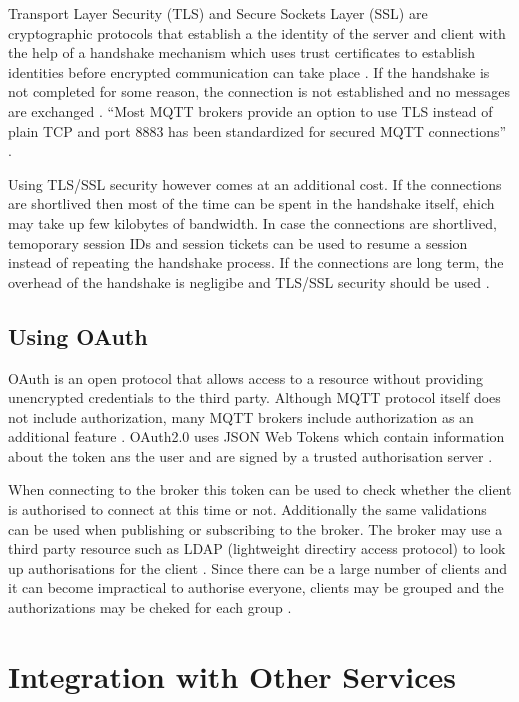 \documentclass[sigconf]{acmart}
\begin{document}
Transport Layer Security (TLS) and Secure Sockets Layer (SSL) are
cryptographic protocols that establish a the identity of the server
and client with the help of a handshake mechanism which uses trust
certificates to establish identities before encrypted communication
can take place \cite{ibm-mqtt-security}. If the handshake is not
completed for some reason, the connection is not established and no
messages are exchanged \cite{mqtt-sec-ssl}. ``Most MQTT brokers
provide an option to use TLS instead of plain TCP and port 8883 has
been standardized for secured MQTT connections''
\cite{iot-design-mqtt-security}.

Using TLS/SSL security however comes at an additional cost. If the
connections are shortlived then most of the time can be spent in the
handshake itself, ehich may take up few kilobytes of bandwidth. In
case the connections are shortlived, temoporary session IDs and
session tickets can be used to resume a session instead of repeating
the handshake process. If the connections are long term, the overhead
of the handshake is negligibe and TLS/SSL security should be used
\cite{iot-design-mqtt-security}\cite{mqtt-sec-ssl}.

\subsection{Using OAuth}

OAuth is an open protocol that allows access to a resource without
providing unencrypted credentials to the third party. Although MQTT
protocol itself does not include authorization, many MQTT brokers
include authorization as an additional feature
\cite{ibm-mqtt-security}. OAuth2.0 uses JSON Web Tokens which contain
information about the token ans the user and are signed by a trusted
authorisation server \cite{hivemq-security-oauth}.

When connecting to the broker this token can be used to check whether
the client is authorised to connect at this time or not. Additionally
the same validations can be used when publishing or subscribing to the
broker. The broker may use a third party resource such as LDAP
(lightweight directiry access protocol) to look up authorisations for
the client \cite{hivemq-security-oauth}. Since there can be a large
number of clients and it can become impractical to authorise everyone,
clients may be grouped and the authorizations may be cheked for each
group \cite{ibm-mqtt-security}.
  
\section{Integration with Other Services}
\end{document}
